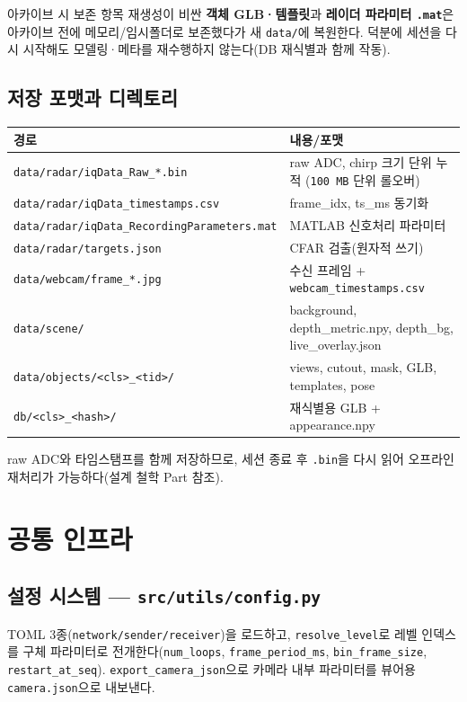 \begin{designbox}{아카이브 시 보존 항목}
재생성이 비싼 \textbf{객체 GLB·템플릿}과 \textbf{레이더 파라미터 \texttt{.mat}}은
아카이브 전에 메모리/임시폴더로 보존했다가 새 \texttt{data/}에 복원한다. 덕분에
세션을 다시 시작해도 모델링·메타를 재수행하지 않는다(DB 재식별과 함께 작동).
\end{designbox}

\section{저장 포맷과 디렉토리}
\begin{center}
\begin{tabular}{@{}lp{8cm}@{}}
\toprule
경로 & 내용/포맷 \\
\midrule
\texttt{data/radar/iqData\_Raw\_*.bin} & raw ADC, chirp 크기 단위 누적
   (\texttt{100\,MB} 단위 롤오버) \\
\texttt{data/radar/iqData\_timestamps.csv} & frame\_idx, ts\_ms 동기화 \\
\texttt{data/radar/iqData\_RecordingParameters.mat} & MATLAB 신호처리 파라미터 \\
\texttt{data/radar/targets.json} & CFAR 검출(원자적 쓰기) \\
\texttt{data/webcam/frame\_*.jpg} & 수신 프레임 + \texttt{webcam\_timestamps.csv} \\
\texttt{data/scene/} & background, depth\_metric.npy, depth\_bg, live\_overlay.json \\
\texttt{data/objects/<cls>\_<tid>/} & views, cutout, mask, GLB, templates, pose \\
\texttt{db/<cls>\_<hash>/} & 재식별용 GLB + appearance.npy \\
\bottomrule
\end{tabular}
\end{center}
raw ADC와 타임스탬프를 함께 저장하므로, 세션 종료 후 \texttt{.bin}을 다시 읽어
오프라인 재처리가 가능하다(설계 철학 Part 참조).

\chapter{공통 인프라}

\section{설정 시스템 — \texttt{src/utils/config.py}}
TOML 3종(\texttt{network/sender/receiver})을 로드하고, \texttt{resolve\_level}로
레벨 인덱스를 구체 파라미터로 전개한다(\texttt{num\_loops}, \texttt{frame\_period\_ms},
\texttt{bin\_frame\_size}, \texttt{restart\_at\_seq}). \texttt{export\_camera\_json}으로
카메라 내부 파라미터를 뷰어용 \texttt{camera.json}으로 내보낸다.

